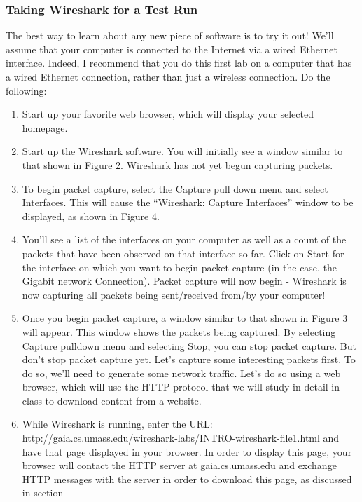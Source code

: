 \documentclass[11pt,a4paper]{article}
\begin{document}
\subsubsection{Taking Wireshark for a Test Run}
The best way to learn about any new piece of software is to try it out! We’ll assume that
your computer is connected to the Internet via a wired Ethernet interface. Indeed, I
recommend that you do this first lab on a computer that has a wired Ethernet connection,
rather than just a wireless connection. Do the following:

\begin{enumerate}
    \item Start up your favorite web browser, which will display your selected homepage.
    \item Start up the Wireshark software. You will initially see a window similar to that
    shown in Figure 2. Wireshark has not yet begun capturing packets.
    \item To begin packet capture, select the Capture pull down menu and select Interfaces.
    This will cause the “Wireshark: Capture Interfaces” window to be displayed, as
    shown in Figure 4.
    \item You’ll see a list of the interfaces on your computer as well as a count of the
    packets that have been observed on that interface so far. Click on Start for the
    interface on which you want to begin packet capture (in the case, the Gigabit
    network Connection). Packet capture will now begin - Wireshark is now
    capturing all packets being sent/received from/by your computer!
    \item Once you begin packet capture, a window similar to that shown in Figure 3 will
    appear. This window shows the packets being captured. By selecting Capture
    pulldown menu and selecting Stop, you can stop packet capture. But don’t stop
    packet capture yet. Let’s capture some interesting packets first. To do so, we’ll
    need to generate some network traffic. Let’s do so using a web browser, which
    will use the HTTP protocol that we will study in detail in class to download
    content from a website.
    \item While Wireshark is running, enter the URL:
    http://gaia.cs.umass.edu/wireshark-labs/INTRO-wireshark-file1.html
    and have that page displayed in your browser. In order to display this page, your
    browser will contact the HTTP server at gaia.cs.umass.edu and exchange HTTP
    messages with the server in order to download this page, as discussed in section

\end{enumerate}
\end{document}
